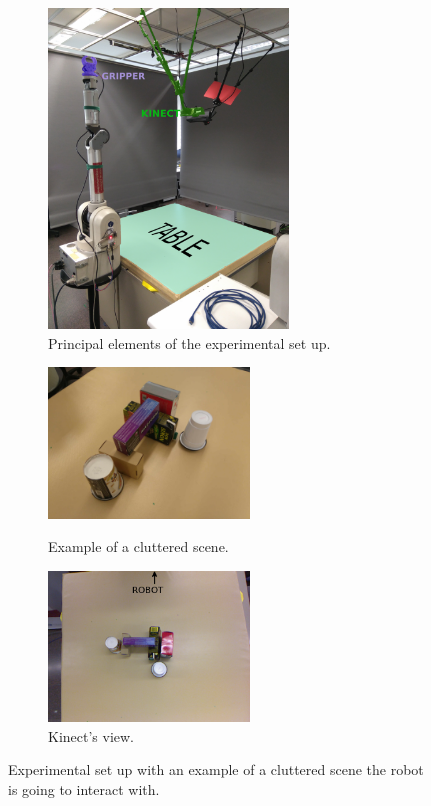 \begin{figure}[tb]
\centering
\begin{subfigure}[b]{0.4\textwidth}
\includegraphics[height=8.5cm]{Img/set_up/set_up_nice2.png}
\caption{Principal elements of the experimental set up.}\label{fig:setup_}
\end{subfigure}
\qquad \qquad 
\begin{subfigure}[b]{0.4\textwidth}
\centering
\includegraphics[height=4cm]{Img/set_up/example_setup.jpg}
\caption{Example of a cluttered scene.}\label{fig:example_scene}
\vspace{2ex}
\includegraphics[height=4cm]{Img/set_up/view_kinect.png}
\caption{Kinect's view.}\label{fig:kinect_view}
\end{subfigure}
\caption{Experimental set up with an example of a cluttered scene the robot is going to interact with.}
\label{fig:setup}
\end{figure}





